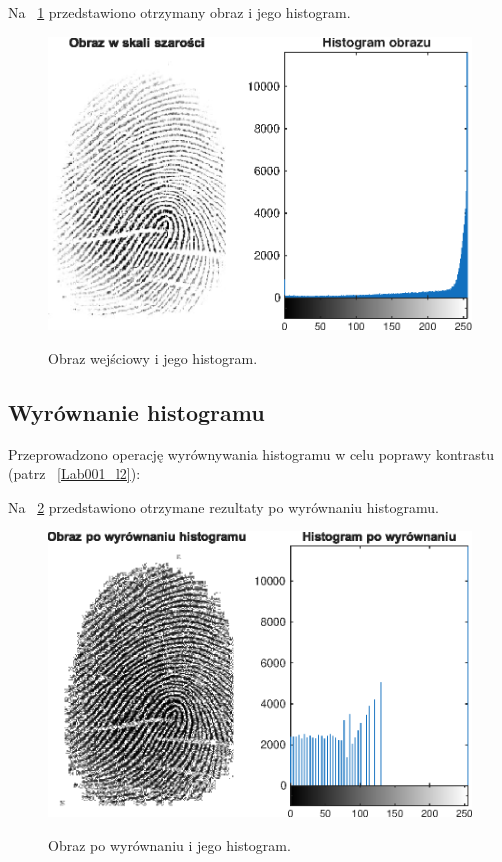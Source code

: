 

\noindent Na \figurename~\ref{Wyniki001} przedstawiono otrzymany obraz i jego histogram.

\begin{figure}[H]
    \centering
    \includegraphics[width=0.7\linewidth]{figures/finger001.eps}\\
    \caption{Obraz wejściowy i jego histogram.\label{Wyniki001}}
\end{figure}

\subsection{Wyrównanie histogramu}
Przeprowadzono operację wyrównywania histogramu w celu poprawy kontrastu (patrz \listingname~\ref{Lab001_l2}):



\noindent Na \figurename~\ref{Wyniki002} przedstawiono otrzymane rezultaty po wyrównaniu histogramu.

\begin{figure}[H]
    \centering
    \includegraphics[width=0.7\linewidth]{figures/fingeHistogram.eps}\\
    \caption{Obraz po wyrównaniu i jego histogram.\label{Wyniki002}}
\end{figure}


